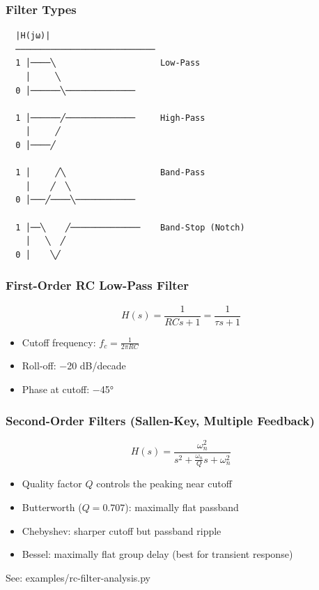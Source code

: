 \documentclass[11pt,a4paper]{book}
\begin{document}
\subsubsection{Filter Types}

\begin{lstlisting}
  |H(jω)|
  ────────────────────────────
  1 │────╲                     Low-Pass
    │     ╲
  0 │──────╲──────────────
  
  1 │──────╱──────────────     High-Pass
    │     ╱
  0 │────╱
  
  1 │     ╱╲                   Band-Pass
    │    ╱  ╲
  0 │───╱────╲────────────
  
  1 │──╲    ╱──────────────    Band-Stop (Notch)
    │   ╲  ╱
  0 │    ╲╱
\end{lstlisting}

\subsubsection{First-Order RC Low-Pass Filter}

\[H(s) = \frac{1}{RCs + 1} = \frac{1}{\tau s + 1}\]

\begin{itemize}
\item Cutoff frequency: $f_c = \frac{1}{2\pi RC}$
\item Roll-off: −20 dB/decade
\item Phase at cutoff: −45°
\end{itemize}

\subsubsection{Second-Order Filters (Sallen-Key, Multiple Feedback)}

\[H(s) = \frac{\omega_n^2}{s^2 + \frac{\omega_n}{Q}s + \omega_n^2}\]

\begin{itemize}
\item Quality factor $Q$ controls the peaking near cutoff
\item Butterworth ($Q = 0.707$): maximally flat passband
\item Chebyshev: sharper cutoff but passband ripple
\item Bessel: maximally flat group delay (best for transient response)
\end{itemize}

See: examples/rc-filter-analysis.py

\medskip\noindent\hrulefill\medskip
\end{document}
